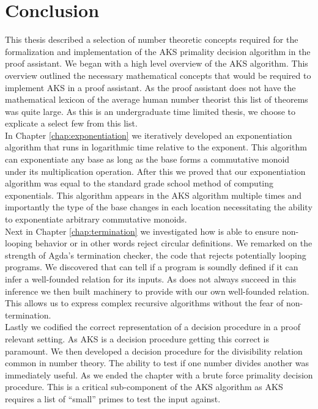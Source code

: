 \documentclass[./Thesis.tex]{subfiles}
\begin{document}
\chapter*{Conclusion}

This thesis described a selection of number theoretic concepts required for the
formalization and implementation of the AKS primality decision algorithm in the
\Agda{} proof assistant. We began with a high level overview of the AKS
algorithm. This overview outlined the necessary mathematical concepts that would
be required to implement AKS in a proof assistant. As the \Agda{} proof
assistant does not have the mathematical lexicon of the average human number
theorist this list of theorems was quite large. As this is an undergraduate time
limited thesis, we choose to explicate a select few from this list. \\

In Chapter \ref{chap:exponentiation} we iteratively developed an exponentiation
algorithm that runs in logarithmic time relative to the exponent. This algorithm
can exponentiate any base as long as the base forms a commutative monoid under
its multiplication operation. After this we proved that our exponentiation
algorithm was equal to the standard grade school method of computing
exponentials. This algorithm appears in the AKS algorithm multiple times and
importantly the type of the base changes in each location necessitating the
ability to exponentiate arbitrary commutative monoids. \\

Next in Chapter \ref{chap:termination} we investigated how \Agda{} is able to
ensure non-looping behavior or in other words reject circular definitions. We
remarked on the strength of Agda's termination checker, the code that rejects
potentially looping programs. We discovered that \Agda{} can tell if a program
is soundly defined if it can infer a well-founded relation for its inputs. As
\Agda{} does not always succeed in this inference we then built machinery to
provide \Agda{} with our own well-founded relation. This allows us to express
complex recursive algorithms without the fear of non-termination. \\

Lastly we codified the correct representation of a
decision procedure in a proof relevant setting. As AKS is a decision procedure
getting this correct is paramount. We then developed a decision procedure for
the divisibility relation common in number theory. The ability to test if one
number divides another was immediately useful. As we ended the chapter with a
brute force primality decision procedure. This is a critical sub-component of the
AKS algorithm as AKS requires a list of ``small'' primes to test the input
against. \\
\end{document}
